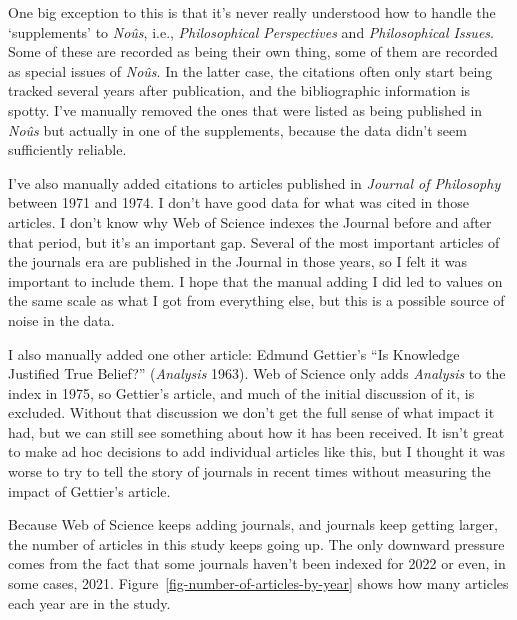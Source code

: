 \documentclass[
  10pt,
  letterpaper,
  DIV=11,
  numbers=noendperiod,
  twoside]{scrartcl}
\begin{document}
One big exception to this is that it's never really understood how to
handle the `supplements' to \emph{Noûs}, i.e., \emph{Philosophical
Perspectives} and \emph{Philosophical Issues}. Some of these are
recorded as being their own thing, some of them are recorded as special
issues of \emph{Noûs}. In the latter case, the citations often only
start being tracked several years after publication, and the
bibliographic information is spotty. I've manually removed the ones that
were listed as being published in \emph{Noûs} but actually in one of the
supplements, because the data didn't seem sufficiently reliable.

I've also manually added citations to articles published in
\emph{Journal of Philosophy} between 1971 and 1974. I don't have good
data for what was cited in those articles. I don't know why Web of
Science indexes the Journal before and after that period, but it's an
important gap. Several of the most important articles of the journals
era are published in the Journal in those years, so I felt it was
important to include them. I hope that the manual adding I did led to
values on the same scale as what I got from everything else, but this is
a possible source of noise in the data.

I also manually added one other article: Edmund Gettier's ``Is Knowledge
Justified True Belief?'' (\emph{Analysis} 1963). Web of Science only
adds \emph{Analysis} to the index in 1975, so Gettier's article, and
much of the initial discussion of it, is excluded. Without that
discussion we don't get the full sense of what impact it had, but we can
still see something about how it has been received. It isn't great to
make ad hoc decisions to add individual articles like this, but I
thought it was worse to try to tell the story of journals in recent
times without measuring the impact of Gettier's article.

Because Web of Science keeps adding journals, and journals keep getting
larger, the number of articles in this study keeps going up. The only
downward pressure comes from the fact that some journals haven't been
indexed for 2022 or even, in some cases, 2021.
Figure~\ref{fig-number-of-articles-by-year} shows how many articles each
year are in the study.
\end{document}
